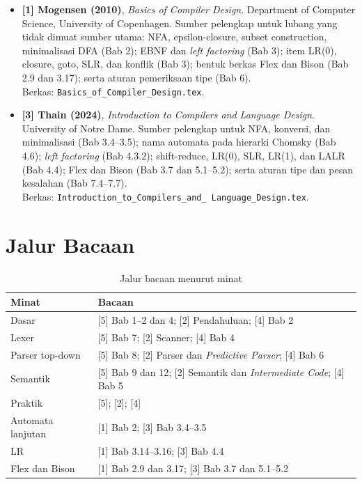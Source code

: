 \begin{itemize}[leftmargin=*]
  \item \textbf{[1] Mogensen (2010)}, \emph{Basics of Compiler
        Design}. Department of Computer Science, University of
        Copenhagen. Sumber pelengkap untuk lubang yang tidak dimuat
        sumber utama: NFA, epsilon-closure, subset construction,
        minimalisasi DFA (Bab 2); EBNF dan \emph{left factoring} (Bab
        3); item LR(0), closure, goto, SLR, dan konflik (Bab 3);
        bentuk berkas Flex dan Bison (Bab 2.9 dan 3.17); serta aturan
        pemeriksaan tipe (Bab 6).\\
        Berkas: \texttt{Basics\_of\_Compiler\_Design.tex}.

  \item \textbf{[3] Thain (2024)}, \emph{Introduction to Compilers
        and Language Design}. University of Notre Dame. Sumber
        pelengkap untuk NFA, konversi, dan minimalisasi (Bab 3.4--3.5);
        nama automata pada hierarki Chomsky (Bab 4.6); \emph{left
        factoring} (Bab 4.3.2); shift-reduce, LR(0), SLR, LR(1), dan
        LALR (Bab 4.4); Flex dan Bison (Bab 3.7 dan 5.1--5.2); serta
        aturan tipe dan pesan kesalahan (Bab 7.4--7.7).\\
        Berkas: \texttt{Introduction\_to\_Compilers\_and\_\allowbreak
        Language\_Design.tex}.
\end{itemize}

\section{Jalur Bacaan}
\label{app:referensi-jalur}

\begin{table}[H]
\centering
\caption{Jalur bacaan menurut minat}
\label{tab:app-jalur}
\begin{tabularx}{\textwidth}{@{}l X@{}}
\toprule
\textbf{Minat} & \textbf{Bacaan} \\
\midrule
Dasar & [5] Bab 1--2 dan 4; [2] Pendahuluan; [4] Bab 2 \\
Lexer & [5] Bab 7; [2] Scanner; [4] Bab 4 \\
Parser top-down & [5] Bab 8; [2] Parser dan \emph{Predictive Parser}; [4] Bab 6 \\
Semantik & [5] Bab 9 dan 12; [2] Semantik dan \emph{Intermediate Code}; [4] Bab 5 \\
Praktik & [5]; [2]; [4] \\
Automata lanjutan & [1] Bab 2; [3] Bab 3.4--3.5 \\
LR & [1] Bab 3.14--3.16; [3] Bab 4.4 \\
Flex dan Bison & [1] Bab 2.9 dan 3.17; [3] Bab 3.7 dan 5.1--5.2 \\
\bottomrule
\end{tabularx}
\end{table}

